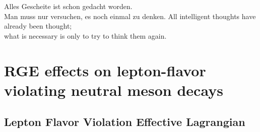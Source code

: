  \begin{savequote}[8cm]                                
  Alles Gescheite ist schon gedacht worden.\\                                                       Man muss nur versuchen, es noch einmal zu denken.                                  
  All intelligent thoughts have already been thought;\\                                             what is necessary is only to try to think them again.                   
  \end{savequote}                                
                                  
  \chapter{\label{ch:2-meson-decay}RGE effects on lepton-flavor violating neutral meson decays}                          
                                                      
  \minitoc                                            
                                  
  \section{Lepton Flavor Violation Effective Lagrangian}  
                                                         

  
  
  
  

  
